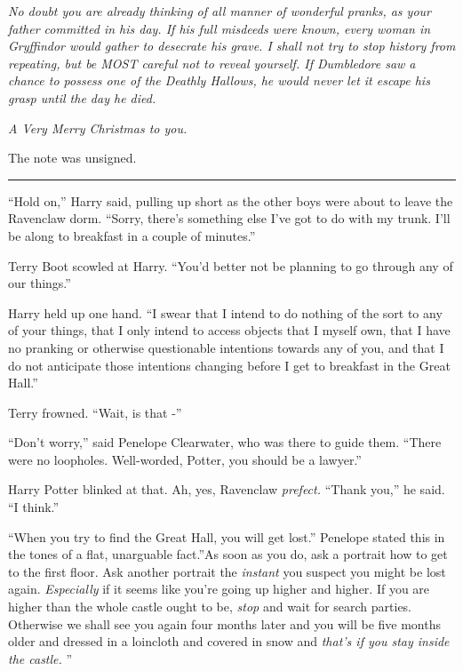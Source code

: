 \emph{No doubt you are already thinking of all manner of wonderful
pranks, as your father committed in his day. If his full misdeeds were
known, every woman in Gryffindor would gather to desecrate his grave. I
shall not try to stop history from repeating, but be MOST careful not to
reveal yourself. If Dumbledore saw a chance to possess one of the
Deathly Hallows, he would never let it escape his grasp until the day he
died.}

\emph{A Very Merry Christmas to you.}

The note was unsigned.

\begin{center}\rule{3in}{0.4pt}\end{center}

``Hold on,'' Harry said, pulling up short as the other boys were about
to leave the Ravenclaw dorm. ``Sorry, there's something else I've got to
do with my trunk. I'll be along to breakfast in a couple of minutes.''

Terry Boot scowled at Harry. ``You'd better not be planning to go
through any of our things.''

Harry held up one hand. ``I swear that I intend to do nothing of the
sort to any of your things, that I only intend to access objects that I
myself own, that I have no pranking or otherwise questionable intentions
towards any of you, and that I do not anticipate those intentions
changing before I get to breakfast in the Great Hall.''

Terry frowned. ``Wait, is that -''

``Don't worry,'' said Penelope Clearwater, who was there to guide them.
``There were no loopholes. Well-worded, Potter, you should be a
lawyer.''

Harry Potter blinked at that. Ah, yes, Ravenclaw \emph{prefect.} ``Thank
you,'' he said. ``I think.''

``When you try to find the Great Hall, you will get lost.'' Penelope
stated this in the tones of a flat, unarguable fact.''As soon as you do,
ask a portrait how to get to the first floor. Ask another portrait the
\emph{instant} you suspect you might be lost again. \emph{Especially} if
it seems like you're going up higher and higher. If you are higher than
the whole castle ought to be, \emph{stop} and wait for search parties.
Otherwise we shall see you again four months later and you will be five
months older and dressed in a loincloth and covered in snow and
\emph{that's if you stay inside the castle.} ''

